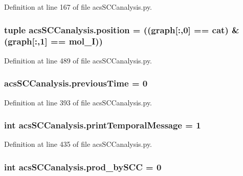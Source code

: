 Definition at line 167 of file acs\-S\-C\-Canalysis.\-py.

\hypertarget{a00097_ac09e85f8df5b7c8c7d2caf87e9193421}{
\subsubsection[{position}]{\setlength{\rightskip}{0pt plus 5cm}tuple acs\-S\-C\-Canalysis.\-position = (({\bf graph}\mbox{[}\-:,0\mbox{]} == {\bf cat}) \& ({\bf graph}\mbox{[}\-:,1\mbox{]} == {\bf mol\-\_\-\-I}))}}\label{a00097_ac09e85f8df5b7c8c7d2caf87e9193421}


Definition at line 489 of file acs\-S\-C\-Canalysis.\-py.

\hypertarget{a00097_aff96a31e98ac46cb47a67b74f5d87351}{
\subsubsection[{previous\-Time}]{\setlength{\rightskip}{0pt plus 5cm}acs\-S\-C\-Canalysis.\-previous\-Time = 0}}\label{a00097_aff96a31e98ac46cb47a67b74f5d87351}


Definition at line 393 of file acs\-S\-C\-Canalysis.\-py.

\hypertarget{a00097_a3de1ee32e24403b152d565d8c52cf7fd}{
\subsubsection[{print\-Temporal\-Message}]{\setlength{\rightskip}{0pt plus 5cm}int acs\-S\-C\-Canalysis.\-print\-Temporal\-Message = 1}}\label{a00097_a3de1ee32e24403b152d565d8c52cf7fd}


Definition at line 435 of file acs\-S\-C\-Canalysis.\-py.

\hypertarget{a00097_abb2ac92624837ae48b882d145c5aab11}{
\subsubsection[{prod\-\_\-by\-S\-C\-C}]{\setlength{\rightskip}{0pt plus 5cm}int acs\-S\-C\-Canalysis.\-prod\-\_\-by\-S\-C\-C = 0}}\label{a00097_abb2ac92624837ae48b882d145c5aab11}


